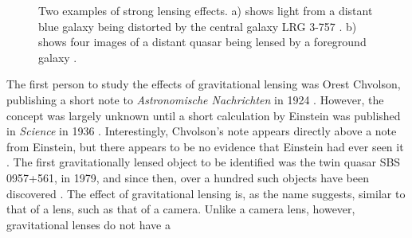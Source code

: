 \documentclass[a4paper,11pt,twoside]{article}
\begin{document}
   \begin{figure}[h]
   \centering
   \qquad
   \caption{Two examples of strong lensing effects. a) shows light from
   a distant blue galaxy being distorted by the central galaxy LRG 3-757
   \cite{einsteinring}. b) shows four images of a distant quasar being lensed by a
   foreground galaxy \cite{eincross}.}
   \label{fig:stronglens}
   \end{figure}
   The first person to study the effects of gravitational lensing was Orest
   Chvolson, publishing a short note to \emph{Astronomische Nachrichten} in 1924
   \cite{chwolsonlensing}. However, the concept was largely unknown until a
   short calculation by Einstein was published in \emph{Science} in 1936
   \cite{einsteinlensing}. Interestingly, Chvolson's note appears directly above
   a note from Einstein\cite{einsteinchwolson}, but there appears to be no
   evidence that Einstein had ever seen it \cite{renn2000eclipses}. The first
   gravitationally lensed object to be identified was the twin quasar SBS
   0957+561, in 1979, and since then, over a hundred such objects have been
   discovered \cite{firstlens,gravlenscount}. The effect of gravitational
   lensing is, as the name suggests, similar to that of a lens, such as that of
   a camera. Unlike a camera lens, however, gravitational lenses do not have a
\end{document}
